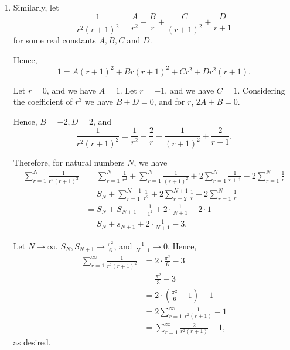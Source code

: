 \begin{enumerate}
    \item Similarly, let
          \[
              \frac{1}{r^2 (r + 1)^2} = \frac{A}{r^2} + \frac{B}{r} + \frac{C}{(r + 1)^2} + \frac{D}{r + 1}
          \]
          for some real constants \(A, B, C\) and \(D\).

          Hence,
          \[
              1 = A (r + 1)^2 + B r (r + 1)^2 + C r^2 + D r^2 (r + 1).
          \]

          Let \(r = 0\), and we have \(A = 1\). Let \(r = -1\), and we have \(C = 1\). Considering the coefficient of \(r^3\) we have \(B + D = 0\), and for \(r\), \(2A + B = 0\).

          Hence, \(B = -2, D = 2\), and
          \[
              \frac{1}{r^2 (r + 1)^2} = \frac{1}{r^2} - \frac{2}{r} + \frac{1}{(r + 1)^2} + \frac{2}{r + 1}.
          \]

          Therefore, for natural numbers \(N\), we have
          \begin{align*}
              \sum_{r = 1}^{N} \frac{1}{r^2 (r + 1)^2} & = \sum_{r = 1}^{N} \frac{1}{r^2} + \sum_{r = 1}^{N} \frac{1}{(r + 1)^2} + 2 \sum_{r = 1}^{N} \frac{1}{r + 1} - 2 \sum_{r = 1}^{N} \frac{1}{r} \\
                                                       & = S_N + \sum_{r = 1}^{N + 1} \frac{1}{r^2} + 2 \sum_{r = 2}^{N + 1} \frac{1}{r} - 2 \sum_{r = 1}^{N} \frac{1}{r}                              \\
                                                       & = S_{N} + S_{N + 1} - \frac{1}{1^2} + 2 \cdot \frac{1}{N + 1} - 2 \cdot 1                                                                     \\
                                                       & = S_{N} + s_{N + 1} + 2 \cdot \frac{1}{N + 1} - 3.
          \end{align*}

          Let \(N \to \infty\). \(S_{N}, S_{N + 1} \to \frac{\pi^2}{6}\), and \(\frac{1}{N + 1} \to 0\). Hence,
          \begin{align*}
              \sum_{r = 1}^{\infty} \frac{1}{r^2 (r + 1)^2} & = 2 \cdot \frac{\pi^2}{6} - 3                       \\
                                                            & = \frac{\pi^2}{3} - 3                               \\
                                                            & = 2 \cdot \left(\frac{\pi^2}{6} - 1\right) - 1      \\
                                                            & = 2 \sum_{r = 1}^{\infty} \frac{1}{r^2 (r + 1)} - 1 \\
                                                            & = \sum_{r = 1}^{\infty} \frac{2}{r^2 (r + 1)} - 1,
          \end{align*}
          as desired.
\end{enumerate}